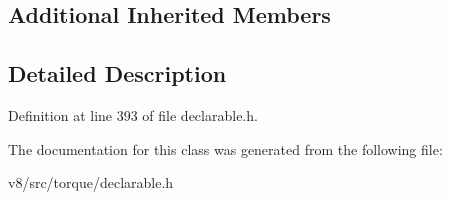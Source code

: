 \subsection*{Additional Inherited Members}


\subsection{Detailed Description}


Definition at line 393 of file declarable.\+h.



The documentation for this class was generated from the following file\+:\begin{DoxyCompactItemize}
\item 
v8/src/torque/declarable.\+h\end{DoxyCompactItemize}
